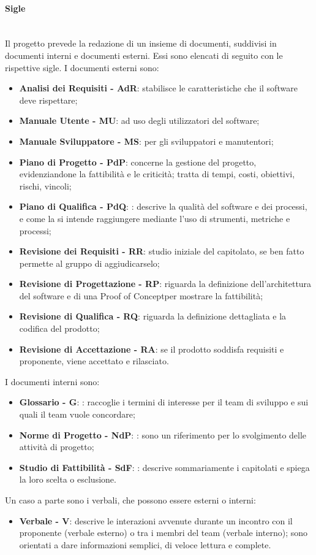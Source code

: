 		\paragraph{Sigle} \mbox{}\\
		Il progetto prevede la redazione di un insieme di documenti, suddivisi in documenti interni e documenti esterni. Essi sono elencati di seguito con le rispettive sigle.\newline
		I documenti esterni sono:		
		\begin{itemize}
			\item \textbf{Analisi dei Requisiti - AdR}: stabilisce le caratteristiche che il software deve rispettare;
			\item \textbf{Manuale Utente - MU}: ad uso degli utilizzatori del software;
			\item \textbf{Manuale Sviluppatore - MS}: per gli sviluppatori e manutentori;
			\item \textbf{Piano di Progetto - PdP}:  concerne la gestione del progetto, evidenziandone la fattibilità e le criticità; tratta di tempi, costi, obiettivi, rischi, vincoli;
			\item \textbf{Piano di Qualifica - PdQ}: : descrive la qualità del software e dei processi, e come la si intende raggiungere mediante l'uso di strumenti, metriche e processi;
			\item \textbf{Revisione dei Requisiti - RR}: studio iniziale del capitolato, se ben fatto permette al gruppo di aggiudicarselo;
			\item \textbf{Revisione di Progettazione - RP}: riguarda la definizione dell'architettura del software e di una Proof of Concept\glosp per mostrare la fattibilità;
			\item \textbf{Revisione di Qualifica - RQ}: riguarda la definizione dettagliata e la codifica del prodotto;
			\item \textbf{Revisione di Accettazione - RA}: se il prodotto soddisfa requisiti e proponente, viene accettato e rilasciato.		
		\end{itemize}	
		I documenti interni sono:
		\begin{itemize}
			\item \textbf{Glossario - G}: : raccoglie i termini di interesse per il team di sviluppo e sui quali il team vuole concordare;
			\item \textbf{Norme di Progetto - NdP}: : sono un riferimento per lo svolgimento delle attività di progetto;
			\item \textbf{Studio di Fattibilità - SdF}: : descrive sommariamente i capitolati e spiega la loro scelta o esclusione.
		\end{itemize}
		Un caso a parte sono i verbali, che possono essere esterni o interni:
		\begin{itemize}
			\item \textbf{Verbale - V}: descrive le interazioni avvenute durante un incontro con il proponente (verbale esterno) o tra i membri del team (verbale interno); sono orientati a dare informazioni semplici, di veloce lettura e complete.
		\end{itemize}

